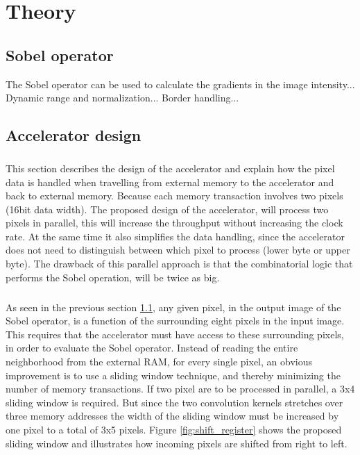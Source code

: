 \chapter{Theory}

\section{Sobel operator}
\label{sec:Sobel}
The Sobel operator can be used to calculate the gradients in the image intensity...
Dynamic range and normalization...
Border handling...

\section{Accelerator design} 
\label{sec:AccDesign}
\paragraph*{}
This section describes the design of the accelerator and explain how the pixel data is handled when travelling from external memory to the accelerator and back to external memory. 
Because each memory transaction involves two pixels (16bit data width). The proposed design of the accelerator, will process two pixels in parallel, this will increase the throughput without increasing the clock rate. At the same time it also simplifies the data handling, since the accelerator does not need to distinguish between which pixel to process (lower byte or upper byte). The drawback of this parallel approach is that the combinatorial logic that performs the Sobel operation, will be twice as big.

\paragraph*{}
As seen in the previous section \ref{sec:Sobel}, any given pixel, in the output image of the Sobel operator, is a function of the surrounding eight pixels in the input image. This requires that the accelerator must have access to these surrounding pixels, in order to evaluate the Sobel operator. Instead of reading the entire neighborhood from the external RAM, for every single pixel, an obvious improvement is to use a sliding window technique, and thereby minimizing the number of memory transactions. If two pixel are to be processed in parallel, a 3x4 sliding window is required. But since the two convolution kernels stretches over three memory addresses the width of the sliding window must be increased by one pixel to a total of 3x5 pixels.
Figure \ref{fig:shift_register} shows the proposed sliding window and illustrates how incoming pixels are shifted from right to left.

